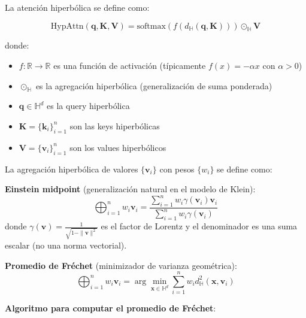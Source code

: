 \begin{definition}\label{def:atencion_hiperbolica}
La atención hiperbólica se define como:

\begin{equation}
    \text{HypAttn}(\mathbf{q}, \mathbf{K}, \mathbf{V}) = \text{softmax}(f(d_{\mathbb{H}}(\mathbf{q}, \mathbf{K}))) \odot_{\mathbb{H}} \mathbf{V}
    \label{eq:hyperbolic_attention}
\end{equation}

donde:
\begin{itemize}
    \item $f: \mathbb{R} \to \mathbb{R}$ es una función de activación (típicamente $f(x) = -\alpha x$ con $\alpha > 0$)
    \item $\odot_{\mathbb{H}}$ es la agregación hiperbólica (generalización de suma ponderada)
    \item $\mathbf{q} \in \mathbb{H}^d$ es la query hiperbólica
    \item $\mathbf{K} = \{\mathbf{k}_i\}_{i=1}^n$ son las keys hiperbólicas
    \item $\mathbf{V} = \{\mathbf{v}_i\}_{i=1}^n$ son los values hiperbólicos
\end{itemize}
\end{definition}

\begin{definition}\label{def:agregacion_hiperbolica}
La agregación hiperbólica de valores $\{\mathbf{v}_i\}$ con pesos $\{w_i\}$ se define como:

\textbf{Einstein midpoint} (generalización natural en el modelo de Klein):
\begin{equation}
\bigoplus_{i=1}^n w_i \mathbf{v}_i = \frac{\sum_{i=1}^n w_i \gamma(\mathbf{v}_i) \mathbf{v}_i}{\sum_{i=1}^n w_i \gamma(\mathbf{v}_i)}
\end{equation}
donde $\gamma(\mathbf{v}) = \frac{1}{\sqrt{1-\|\mathbf{v}\|^2}}$ es el factor de Lorentz y el denominador es una suma escalar (no una norma vectorial).

\textbf{Promedio de Fréchet} (minimizador de varianza geométrica):
\begin{equation}
\bigoplus_{i=1}^n w_i \mathbf{v}_i = \arg\min_{\mathbf{x} \in \mathbb{H}^d} \sum_{i=1}^n w_i d_{\mathbb{H}}^2(\mathbf{x}, \mathbf{v}_i)
\end{equation}
\end{definition}

\textbf{Algoritmo para computar el promedio de Fréchet}:

